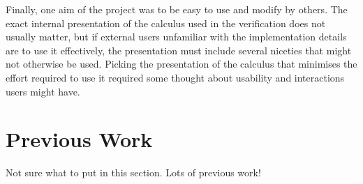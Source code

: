 Finally, one aim of the project was to be easy to use and modify by others.
The exact internal presentation of the calculus used in the verification does not usually matter, but if external users unfamiliar with the implementation details are to use it effectively, the presentation must include several niceties that might not otherwise be used.
Picking the presentation of the calculus that minimises the effort required to use it required some thought about usability and interactions users might have.

\section{Previous Work}
Not sure what to put in this section. Lots of previous work!
